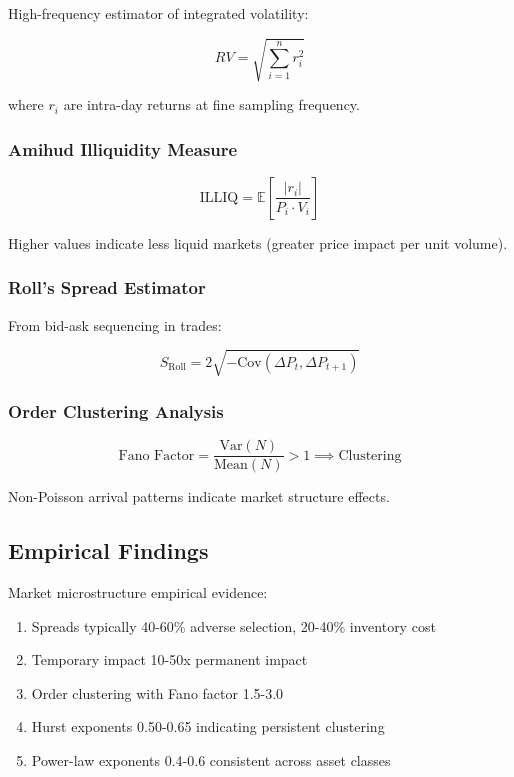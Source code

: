 \documentclass[12pt,a4paper]{article}
\begin{document}
High-frequency estimator of integrated volatility:

\begin{equation}
RV = \sqrt{\sum_{i=1}^{n} r_i^2}
\end{equation}

where $r_i$ are intra-day returns at fine sampling frequency.

\subsubsection{Amihud Illiquidity Measure}

\begin{equation}
\text{ILLIQ} = \mathbb{E}\left[\frac{|r_i|}{P_i \cdot V_i}\right]
\end{equation}

Higher values indicate less liquid markets (greater price impact per unit volume).

\subsubsection{Roll's Spread Estimator}

From bid-ask sequencing in trades:

\begin{equation}
S_{\text{Roll}} = 2\sqrt{-\text{Cov}(\Delta P_t, \Delta P_{t+1})}
\end{equation}

\subsubsection{Order Clustering Analysis}

\begin{equation}
\text{Fano Factor} = \frac{\text{Var}(N)}{\text{Mean}(N)} > 1 \implies \text{Clustering}
\end{equation}

Non-Poisson arrival patterns indicate market structure effects.

\subsection{Empirical Findings}

Market microstructure empirical evidence:
\begin{enumerate}
    \item Spreads typically 40-60\% adverse selection, 20-40\% inventory cost
    \item Temporary impact 10-50x permanent impact
    \item Order clustering with Fano factor 1.5-3.0
    \item Hurst exponents 0.50-0.65 indicating persistent clustering
    \item Power-law exponents 0.4-0.6 consistent across asset classes
\end{enumerate}
\end{document}
